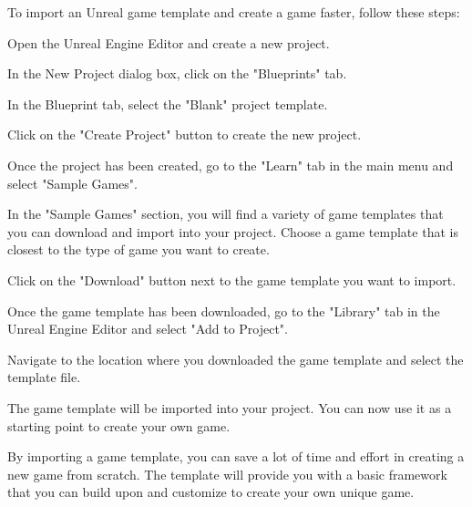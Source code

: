 To import an Unreal game template and create a game faster, follow these steps:

Open the Unreal Engine Editor and create a new project.

In the New Project dialog box, click on the "Blueprints" tab.

In the Blueprint tab, select the "Blank" project template.

Click on the "Create Project" button to create the new project.

Once the project has been created, go to the "Learn" tab in the main menu and select "Sample Games".

In the "Sample Games" section, you will find a variety of game templates that you can download and import into your project. Choose a game template that is closest to the type of game you want to create.

Click on the "Download" button next to the game template you want to import.

Once the game template has been downloaded, go to the "Library" tab in the Unreal Engine Editor and select "Add to Project".

Navigate to the location where you downloaded the game template and select the template file.

The game template will be imported into your project. You can now use it as a starting point to create your own game.

By importing a game template, you can save a lot of time and effort in creating a new game from scratch. The template will provide you with a basic framework that you can build upon and customize to create your own unique game.

